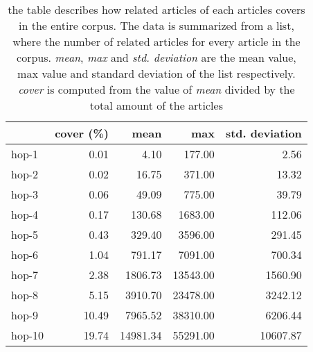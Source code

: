 \begin{table}[!htb]
    \centering
\begin{tabular}{lrrrr}
\hline
        &   cover (\%) &     mean &      max &   std. deviation
 \\
\hline
 hop-1  &        0.01 &     4.10 &   177.00 &       2.56 \\
 hop-2  &        0.02 &    16.75 &   371.00 &      13.32 \\
 hop-3  &        0.06 &    49.09 &   775.00 &      39.79 \\
 hop-4  &        0.17 &   130.68 &  1683.00 &     112.06 \\
 hop-5  &        0.43 &   329.40 &  3596.00 &     291.45 \\
 hop-6  &        1.04 &   791.17 &  7091.00 &     700.34 \\
 hop-7  &        2.38 &  1806.73 & 13543.00 &    1560.90 \\
 hop-8  &        5.15 &  3910.70 & 23478.00 &    3242.12 \\
 hop-9  &       10.49 &  7965.52 & 38310.00 &    6206.44 \\
 hop-10 &       19.74 & 14981.34 & 55291.00 &   10607.87 \\
\hline
\end{tabular}
    \caption{the table describes how related articles of each articles covers in the entire corpus. The data is summarized from a list, where the number of related articles for every article in the corpus. \textit{mean}, \textit{max} and \textit{std. deviation} are the mean value, max value and standard deviation of the list respectively. \textit{cover} is computed from the value of \textit{mean} divided by the total amount of the articles}
    \label{tab:related_cover}
\end{table}
